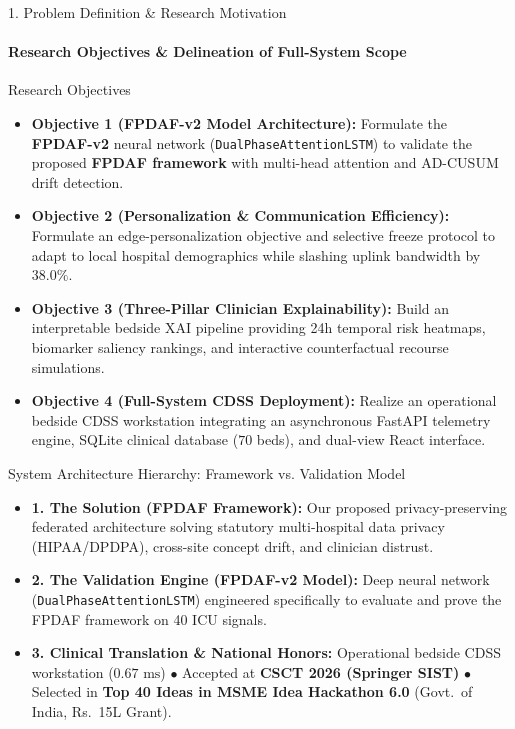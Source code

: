 \documentclass[aspectratio=169, 11pt]{beamer}
\begin{document}
\begin{frame}{1. Problem Definition \& Research Motivation}
    \framesubtitle{Research Objectives \& Delineation of Full-System Scope}
    \begin{block}{Research Objectives}
        \scriptsize
        \begin{itemize}
            \item \textbf{Objective 1 (FPDAF-v2 Model Architecture):} Formulate the \textbf{FPDAF-v2} neural network (\texttt{DualPhaseAttentionLSTM}) to validate the proposed \textbf{FPDAF framework} with multi-head attention and AD-CUSUM drift detection.
            \item \textbf{Objective 2 (Personalization \& Communication Efficiency):} Formulate an edge-personalization objective and selective freeze protocol to adapt to local hospital demographics while slashing uplink bandwidth by $38.0\%$.
            \item \textbf{Objective 3 (Three-Pillar Clinician Explainability):} Build an interpretable bedside XAI pipeline providing 24h temporal risk heatmaps, biomarker saliency rankings, and interactive counterfactual recourse simulations.
            \item \textbf{Objective 4 (Full-System CDSS Deployment):} Realize an operational bedside CDSS workstation integrating an asynchronous FastAPI telemetry engine, SQLite clinical database ($70$ beds), and dual-view React interface.
        \end{itemize}
    \end{block}
    \vspace{-0.18cm}

    \begin{block}{System Architecture Hierarchy: Framework vs. Validation Model}
        \scriptsize
        \begin{itemize}
            \item \textbf{1. The Solution (FPDAF Framework):} Our proposed privacy-preserving federated architecture solving statutory multi-hospital data privacy (HIPAA/DPDPA), cross-site concept drift, and clinician distrust.
            \item \textbf{2. The Validation Engine (FPDAF-v2 Model):} Deep neural network (\texttt{DualPhaseAttentionLSTM}) engineered specifically to evaluate and prove the FPDAF framework on 40 ICU signals.
            \item \textbf{3. Clinical Translation \& National Honors:} Operational bedside CDSS workstation ($0.67\text{ ms}$) $\bullet$ Accepted at \textbf{CSCT 2026 (Springer SIST)} $\bullet$ Selected in \textbf{Top 40 Ideas in MSME Idea Hackathon 6.0} (Govt.\ of India, Rs.~15L Grant).
        \end{itemize}
    \end{block}
\end{frame}
\end{document}
